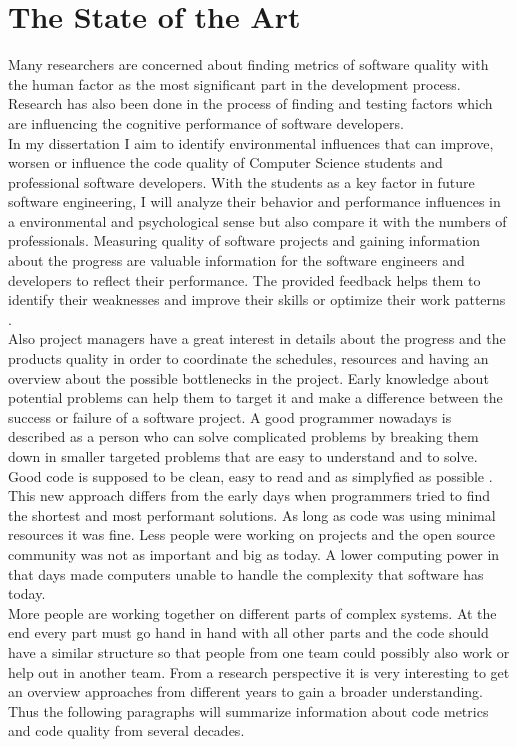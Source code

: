 \chapter{The State of the Art}

Many researchers are concerned about finding metrics of software quality with the human factor as the most significant part in the development process. Research has also been done in the process of finding and testing factors which are influencing the cognitive performance of software developers.\\
In my dissertation I aim to identify environmental influences that can improve, worsen or influence the code quality of Computer Science students and professional software developers.
With the students as a key factor in future software engineering, I will analyze their behavior and performance influences in a environmental and psychological sense but also compare it with the numbers of professionals. \cite{denissen2008effects}
\bigbreak
Measuring quality of software projects and gaining information about the progress are valuable information for the software engineers and developers to reflect their performance. The provided feedback helps them to identify their weaknesses and improve their skills or optimize their work patterns \cite{johnson1999leap} \cite{Martin:2008:CCH:1388398}.\\
Also project managers have a great interest in details about the progress and the products quality in order to coordinate the schedules, resources and having an overview about the possible bottlenecks in the project.
Early knowledge about potential problems can help them to target it and make a difference between the success or failure of a software project.
\bigbreak
A good programmer nowadays is described as a person who can solve complicated problems by breaking them down in smaller targeted problems that are easy to understand and to solve. 
\\
Good code is supposed to be clean, easy to read and as simplyfied as possible \cite{johnson1999leap}.
\\
This new approach differs from the early days when programmers tried to find the shortest and most performant solutions. As long as code was using minimal resources it was fine. Less people were working on projects and the open source community was not as important and big as today. A lower computing power in that days made computers unable to handle the complexity that software has today. \\
More people are working together on different parts of complex systems. At the end every part must go hand in hand with all other parts and the code should have a similar structure so that people from one team could possibly also work or help out in another team.
\bigbreak
From a research perspective it is very interesting to get an overview approaches from different years to gain a broader understanding. Thus the following paragraphs will summarize information about code metrics and code quality from several decades.

